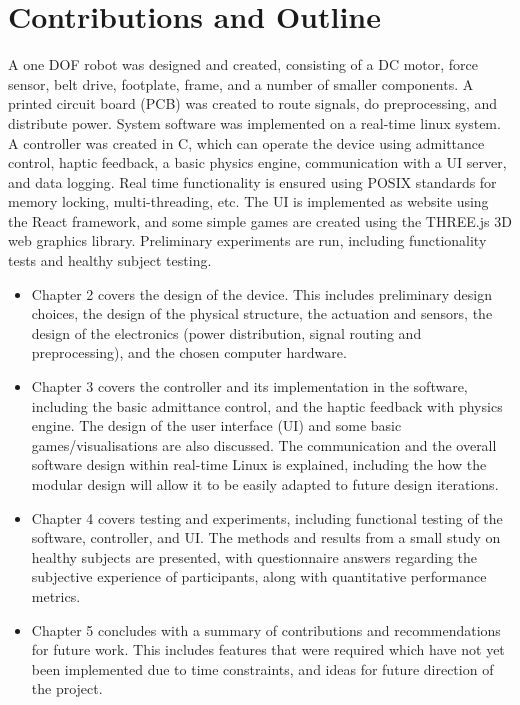 \documentclass[12pt]{report}
\begin{document}
\section{Contributions and Outline}

A one DOF robot was designed and created, consisting of a DC motor, force sensor, belt drive, footplate, frame, and a number of smaller components. A printed circuit board (PCB) was created to route signals, do preprocessing, and distribute power. System software was implemented on a real-time linux system. A controller was created in C, which can operate the device using admittance control, haptic feedback, a basic physics engine, communication with a UI server, and data logging. Real time functionality is ensured using POSIX standards for memory locking, multi-threading, etc. The UI is implemented as website using the React framework, and some simple games are created using the THREE.js 3D web graphics library. Preliminary experiments are run, including functionality tests and healthy subject testing. 

\begin{itemize}

\item Chapter 2 covers the design of the device. This includes preliminary design choices, the design of the physical structure, the actuation and sensors, the design of the electronics (power distribution, signal routing and preprocessing), and the chosen computer hardware. 

\item Chapter 3 covers the controller and its implementation in the software, including the basic admittance control, and the haptic feedback with physics engine. The design of the user interface (UI) and some basic games/visualisations are also discussed. The communication and the overall software design within real-time Linux is explained, including the how the modular design will allow it to be easily adapted to future design iterations. 

\item Chapter 4 covers testing and experiments, including functional testing of the software, controller, and UI. The methods and results from a small study on healthy subjects are presented, with questionnaire answers regarding the subjective experience of participants, along with quantitative performance metrics. 

\item Chapter 5 concludes with a summary of contributions and recommendations for future work. This includes features that were required which have not yet been implemented due to time constraints, and ideas for future direction of the project. 


\end{itemize}
\end{document}
